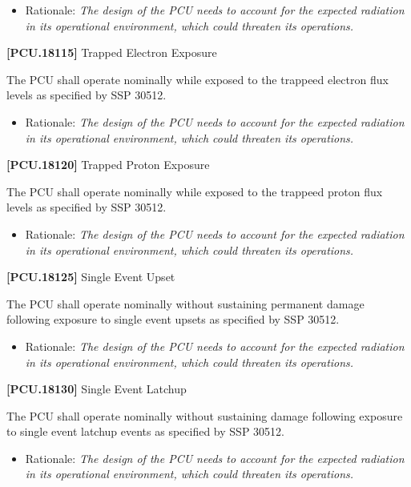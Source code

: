 \begin{itemize}
\item{} Rationale: \emph{The design of the PCU needs to account for the expected radiation in its operational environment, which could threaten its operations.}

\end{itemize}

\textbf{[PCU.18115]} Trapped Electron Exposure

The \gls{PCU} shall operate nominally while exposed to the trappeed electron flux levels as specified by SSP 30512.

\begin{itemize}
\item{} Rationale: \emph{The design of the PCU needs to account for the expected radiation in its operational environment, which could threaten its operations.}

\end{itemize}

\textbf{[PCU.18120]} Trapped Proton Exposure

The \gls{PCU} shall operate nominally while exposed to the trappeed proton flux levels as specified by SSP 30512.

\begin{itemize}
\item{} Rationale: \emph{The design of the PCU needs to account for the expected radiation in its operational environment, which could threaten its operations.}

\end{itemize}

\textbf{[PCU.18125]} Single Event Upset

The \gls{PCU} shall operate nominally without sustaining permanent damage following exposure to single event upsets as specified by SSP 30512.

\begin{itemize}
\item{} Rationale: \emph{The design of the PCU needs to account for the expected radiation in its operational environment, which could threaten its operations.}

\end{itemize}

\textbf{[PCU.18130]} Single Event Latchup

The \gls{PCU} shall operate nominally without sustaining damage following exposure to single event latchup events as specified by SSP 30512.

\begin{itemize}
\item{} Rationale: \emph{The design of the PCU needs to account for the expected radiation in its operational environment, which could threaten its operations.}

\end{itemize}

